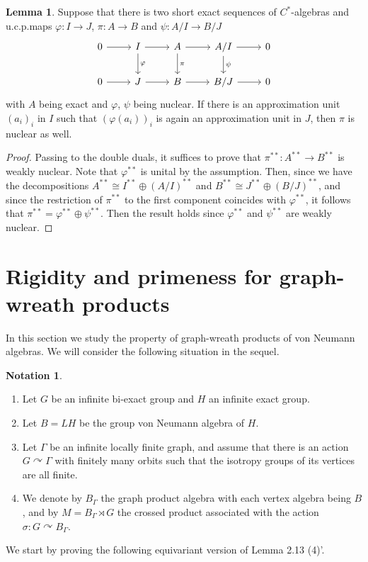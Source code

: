 \documentclass{amsart}
\theoremstyle{definition}
\newtheorem{lemma}[theorem]{Lemma}
\newtheorem{notation}[theorem]{Notation}
\newcommand{\Cstaralgs}{$C^{\ast}$-algebras\xspace}
\newcommand{\bidual}{\ast\ast}
\begin{document}
\begin{lemma}
Suppose that there is two short exact sequences of \Cstaralgs and u.c.p.\@ maps
$\varphi : I\to J$, $\pi : A\to B$ and $\psi : A/I\to B/J$ 
\[
\begin{tikzcd}
  0 \arrow[r] 
    & I \arrow[r] \arrow[d, "\varphi"]
    & A \arrow[r] \arrow[d, "\pi"]
    & A/I \arrow[r] \arrow[d, "\psi"]
    & 0 \\
  0 \arrow[r]
    & J \arrow[r]
    & B \arrow[r]
    & B/J \arrow[r]
    & 0
\end{tikzcd}
\]
with $A$ being exact and $\varphi$, $\psi$ being nuclear. If there is an approximation unit $(a_i)_i$ in $I$ such that $(\varphi(a_i))_i$ is again an approximation unit in $J$, then $\pi$ is nuclear as well. 
\end{lemma}
\begin{proof}
Passing to the double duals, it suffices to prove that $\pi^{\bidual} : A^{\bidual}\to B^{\bidual}$ is weakly nuclear. 
Note that $\varphi^{\bidual}$ is unital by the assumption. 
Then, since we have the decompositions
$A^{\bidual} \cong I^{\bidual}\oplus (A/I)^{\bidual}$ and 
$B^{\bidual} \cong J^{\bidual}\oplus (B/J)^{\bidual}$, 
and since the restriction of $\pi^{\bidual}$ to the first component coincides with $\varphi^{\bidual}$, it follows that $\pi^{\bidual}=\varphi^{\bidual}\oplus \psi^{\bidual}$. Then the result holds since 
$\varphi^{\bidual}$ and  $\psi^{\bidual}$ are weakly nuclear. 
\end{proof}














\section{Rigidity and primeness for graph-wreath products}

In this section we study the property of graph-wreath products of von Neumann algebras. 
We will consider the following situation in the sequel. 
\begin{notation}
\begin{enumerate}
\item Let $G$ be an infinite bi-exact group and $H$ an infinite exact group. 
\item Let $B=LH$ be the group von Neumann algebra of $H$. 
\item Let $\Gamma$ be an infinite locally finite graph, and assume that there is an action $G\curvearrowright \Gamma$ with finitely many orbits such that the isotropy groups of its vertices are all finite. 
\item We denote by $B_{\Gamma}$ the graph product algebra with each vertex algebra being $B$, and by $M=B_{\Gamma}\rtimes G$ the crossed product associated with the action $\sigma:G\curvearrowright B_{\Gamma}$. 
\end{enumerate}
\end{notation}
We start by proving the following equivariant version of Lemma 2.13 (4)'.  
\end{document}
